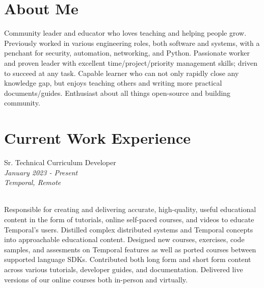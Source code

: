 \documentclass[10pt]{article} %
\begin{document}
\begin{minipage}[t]{0.5\textwidth} %
\vspace{0pt} %
    
\section{About Me}
Community leader and educator who loves teaching and helping people grow. Previously worked in various engineering roles, both software and systems, with a penchant for security, automation, networking, and Python. Passionate worker and proven leader with excellent time/project/priority management skills; driven to succeed at any task. Capable learner who can not only rapidly close any knowledge gap, but enjoys teaching others and writing more practical documents/guides. Enthusiast about all things open-source and building community. \\


\section{Current Work Experience} 


{\raggedright\large Sr. Technical Curriculum Developer\\
\small \textit{January 2023 - Present}\\
\small \textit{Temporal, Remote}} \\

\normalsize{
    Responsible for creating and delivering accurate, high-quality, useful educational content in the form of tutorials, online self-paced courses, and videos to educate Temporal's users. Distilled complex distributed systems and Temporal concepts into approachable educational content. Designed new courses, exercises, code samples, and assesments on Temporal features as well as ported courses between supported language SDKs. Contributed both long form and short form content across various tutorials, developer guides, and documentation. Delivered live versions of our online courses both in-person and virtually.
} \\


\end{minipage}
\end{document}
